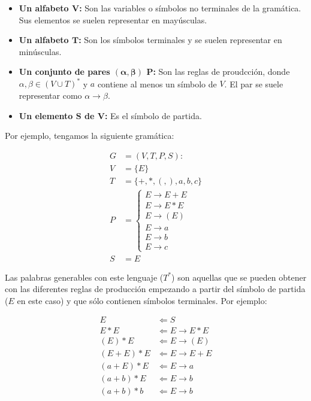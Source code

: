 \begin{itemize}
	\item\textbf{Un alfabeto $\boldsymbol{V}$:} Son las variables o símbolos no terminales de la gramática. Sus elementos se suelen representar en mayúsculas.
	\item\textbf{Un alfabeto $\boldsymbol{T}$:} Son los símbolos terminales y se suelen representar en minúsculas.
\item\textbf{Un conjunto de pares $\boldsymbol{(\alpha,\beta)}$ $\boldsymbol{P}$:} Son las reglas de proudcción, donde $\alpha, \beta \in {(V \cup T)}^*$ y $a$ contiene al menos un símbolo de $V$. El par se suele representar como $\alpha \rightarrow \beta$.
	\item\textbf{Un elemento $\boldsymbol{S}$ de $\boldsymbol{V}$:} Es el símbolo de partida.
\end{itemize}

Por ejemplo, tengamos la siguiente gramática:

\begin{align*}
	G &= (V, T, P, S) : \\
	V &= \{E\} \\
	T &= \{+, *, (,), a, b, c\} \\
	P &=
		\begin{cases}
			E \rightarrow E + E \\
			E \rightarrow E * E \\
			E \rightarrow (E)   \\
			E \rightarrow a     \\
			E \rightarrow b     \\
			E \rightarrow c
		\end{cases} \\
	S &= E
\end{align*}

Las palabras generables con este lenguaje ($T^*$) son aquellas que se pueden obtener con las diferentes reglas de producción empezando a partir del símbolo de partida ($E$ en este caso) y que sólo contienen símbolos terminales.
Por ejemplo:

\begin{align*}
	E           & \Leftarrow S                   \\
	E * E       & \Leftarrow E \rightarrow E * E \\
	(E) * E     & \Leftarrow E \rightarrow (E)   \\
	(E + E) * E & \Leftarrow E \rightarrow E + E \\
	(a + E) * E & \Leftarrow E \rightarrow a     \\
	(a + b) * E & \Leftarrow E \rightarrow b     \\
	(a + b) * b & \Leftarrow E \rightarrow b
\end{align*}

